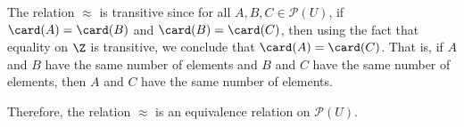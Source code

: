 \newpar
The relation  $ \approx $ is transitive since  for all  $A, B, C \in \mathcal{P}\left( U \right)$, if  $\card(A) = \card(B)$ and  $\card(B) = \card(C)$, then  using the fact that equality on $\Z$ is transitive, we conclude that $\card(A) = \card(C)$.  That is,  if  $A$  and  $B$  have the same number of elements and  $B$  and  $C$  have the same number of elements, then  $A$  and  $C$  have the same number of elements.

\newpar
Therefore, the relation $\approx$ is an equivalence relation on $\mathcal{P}\left( U \right)$.



%
%

\hbreak


\endinput

